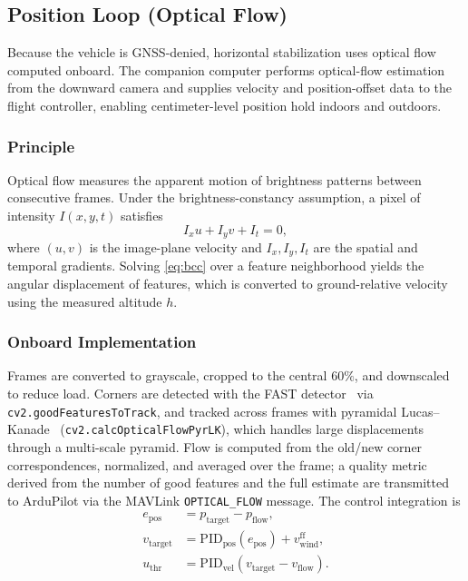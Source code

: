 \documentclass[journal]{IEEEtran}
\begin{document}
\subsection{Position Loop (Optical Flow)}
\label{ssec:flow}
Because the vehicle is GNSS-denied, horizontal stabilization uses optical
flow computed onboard. The companion computer performs optical-flow
estimation from the downward camera and supplies velocity and
position-offset data to the flight controller, enabling
centimeter-level position hold indoors and outdoors.

\subsubsection{Principle}
Optical flow measures the apparent motion of brightness patterns between
consecutive frames. Under the brightness-constancy assumption, a pixel of
intensity $I(x,y,t)$ satisfies
\begin{equation}
I_x u + I_y v + I_t = 0,
\label{eq:bcc}
\end{equation}
where $(u,v)$ is the image-plane velocity and $I_x,I_y,I_t$ are the spatial
and temporal gradients. Solving \eqref{eq:bcc} over a feature
neighborhood yields the angular displacement of features, which is converted
to ground-relative velocity using the measured altitude $h$.

\subsubsection{Onboard Implementation}
Frames are converted to grayscale, cropped to the central $60\%$, and
downscaled to reduce load. Corners are detected with the FAST
detector~\cite{rosten2006fast} via \texttt{cv2.goodFeaturesToTrack}, and
tracked across frames with pyramidal Lucas--Kanade~\cite{lucas1981iterative}
(\texttt{cv2.calcOpticalFlowPyrLK}), which handles large displacements
through a multi-scale pyramid. Flow is computed from the old/new corner
correspondences, normalized, and averaged over the frame; a quality metric
derived from the number of good features and the full estimate are
transmitted to ArduPilot via the MAVLink \texttt{OPTICAL\_FLOW} message.
The control integration is
\begin{align}
e_{\mathrm{pos}} &= p_{\mathrm{target}} - p_{\mathrm{flow}},\\
v_{\mathrm{target}} &= \mathrm{PID}_{\mathrm{pos}}(e_{\mathrm{pos}}) + v_{\mathrm{wind}}^{\mathrm{ff}},\\
u_{\mathrm{thr}} &= \mathrm{PID}_{\mathrm{vel}}(v_{\mathrm{target}} - v_{\mathrm{flow}}).
\end{align}
\end{document}
